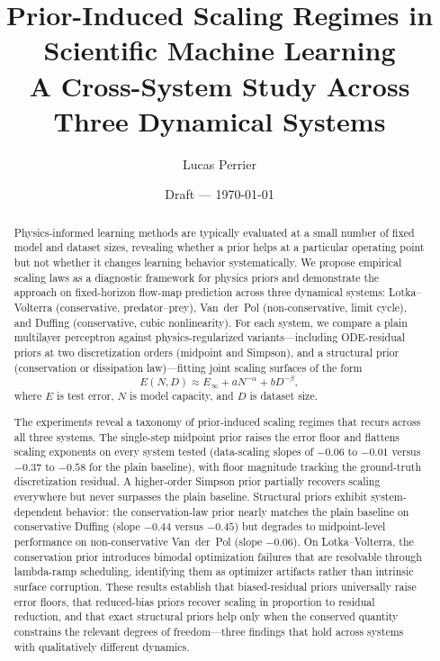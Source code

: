 \documentclass[11pt]{article}
\title{Prior-Induced Scaling Regimes in Scientific Machine Learning\\
\large A Cross-System Study Across Three Dynamical Systems}
\author[1]{Lucas Perrier}
\affil[1]{Affiliation placeholder}
\date{Draft --- \today}
\begin{document}
\maketitle

\begin{abstract}
Physics-informed learning methods are typically evaluated at a small number of fixed model and dataset sizes, revealing whether a prior helps at a particular operating point but not whether it changes learning behavior systematically.
We propose empirical scaling laws as a diagnostic framework for physics priors and demonstrate the approach on fixed-horizon flow-map prediction across three dynamical systems: Lotka--Volterra (conservative, predator--prey), Van~der~Pol (non-conservative, limit cycle), and Duffing (conservative, cubic nonlinearity).
For each system, we compare a plain multilayer perceptron against physics-regularized variants---including ODE-residual priors at two discretization orders (midpoint and Simpson), and a structural prior (conservation or dissipation law)---fitting joint scaling surfaces of the form
\[
E(N,D) \approx E_\infty + aN^{-\alpha} + bD^{-\beta},
\]
where $E$ is test error, $N$ is model capacity, and $D$ is dataset size.

The experiments reveal a taxonomy of prior-induced scaling regimes that recurs across all three systems.
The single-step midpoint prior raises the error floor and flattens scaling exponents on every system tested (data-scaling slopes of $-0.06$ to $-0.01$ versus $-0.37$ to $-0.58$ for the plain baseline), with floor magnitude tracking the ground-truth discretization residual.
A higher-order Simpson prior partially recovers scaling everywhere but never surpasses the plain baseline.
Structural priors exhibit system-dependent behavior: the conservation-law prior nearly matches the plain baseline on conservative Duffing (slope $-0.44$ versus $-0.45$) but degrades to midpoint-level performance on non-conservative Van~der~Pol (slope $-0.06$).
On Lotka--Volterra, the conservation prior introduces bimodal optimization failures that are resolvable through lambda-ramp scheduling, identifying them as optimizer artifacts rather than intrinsic surface corruption.
These results establish that biased-residual priors universally raise error floors, that reduced-bias priors recover scaling in proportion to residual reduction, and that exact structural priors help only when the conserved quantity constrains the relevant degrees of freedom---three findings that hold across systems with qualitatively different dynamics.
\end{abstract}
\end{document}
